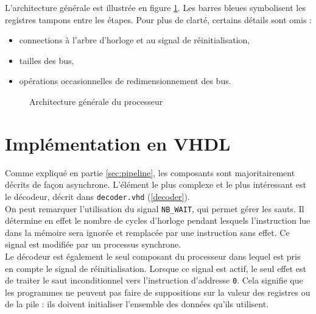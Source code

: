 L'architecture générale est illustrée en figure \ref{fig:architecture}. Les
barres bleues symbolisent les registres tampons entre les étapes. Pour plus de
clarté, certains détails sont omis :
\begin{itemize}
\item connections à l'arbre d'horloge et au signal de réinitialisation,
\item tailles des bus,
\item opérations occasionnelles de redimensionnement des bus.
\end{itemize}

\begin{landscape}
\begin{figure}[!h]
   \centering
    
    \caption{Architecture générale du processeur}
    \label{fig:architecture}
\end{figure}
\end{landscape}

\section{Implémentation en VHDL}

Comme expliqué en partie \ref{sec:pipeline}, les composants sont majoritairement
décrits de façon asynchrone. L'élément le plus complexe et le plus intéressant
est le décodeur, décrit dans \texttt{decoder.vhd} (\ref{decoder}). \\



On peut remarquer l'utilisation du signal \texttt{NB\_WAIT}, qui permet gérer
les sauts. Il détermine en effet le nombre de cycles d'horloge pendant lesquels
l'instruction lue dans la mémoire sera ignorée et remplacée par une instruction
sans effet. Ce signal est modifiée par un processus synchrone. \\

Le décodeur est également le seul composant du processeur dans lequel est pris
en compte le signal de réinitialisation. Lorsque ce signal est actif, le seul
effet est de traiter le saut inconditionnel vers l'instruction d'addresse
\texttt{0}. Cela signifie que les programmes ne peuvent pas faire de
suppositions sur la valeur des registres ou de la pile : ils doivent initialiser
l'ensemble des données qu'ils utilisent.
